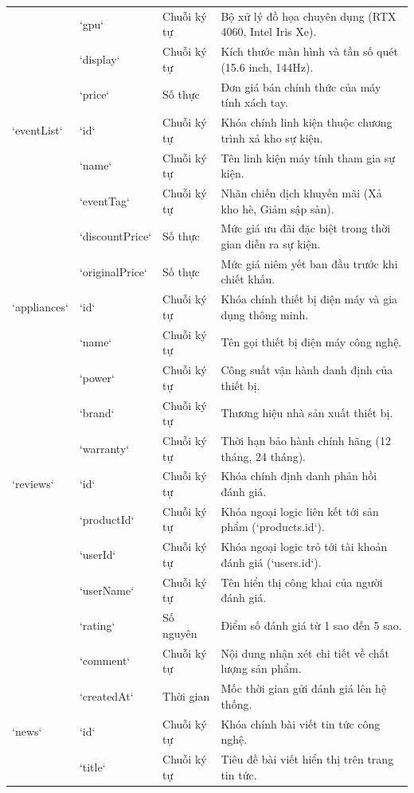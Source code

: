 \begin{table}[H]
\begin{tabularx}{\textwidth}{p{2.5cm}p{2.3cm}p{1.8cm}X}
& `gpu` & Chuỗi ký tự & Bộ xử lý đồ họa chuyên dụng (RTX 4060, Intel Iris Xe). \\
& `display` & Chuỗi ký tự & Kích thước màn hình và tần số quét (15.6 inch, 144Hz). \\
& `price` & Số thực & Đơn giá bán chính thức của máy tính xách tay. \\
\addlinespace
`eventList` & `id` & Chuỗi ký tự & Khóa chính linh kiện thuộc chương trình xả kho sự kiện. \\
& `name` & Chuỗi ký tự & Tên linh kiện máy tính tham gia sự kiện. \\
& `eventTag` & Chuỗi ký tự & Nhãn chiến dịch khuyến mãi (Xả kho hè, Giảm sập sàn). \\
& `discountPrice`& Số thực & Mức giá ưu đãi đặc biệt trong thời gian diễn ra sự kiện. \\
& `originalPrice`& Số thực & Mức giá niêm yết ban đầu trước khi chiết khấu. \\
\addlinespace
`appliances` & `id` & Chuỗi ký tự & Khóa chính thiết bị điện máy và gia dụng thông minh. \\
& `name` & Chuỗi ký tự & Tên gọi thiết bị điện máy công nghệ. \\
& `power` & Chuỗi ký tự & Công suất vận hành danh định của thiết bị. \\
& `brand` & Chuỗi ký tự & Thương hiệu nhà sản xuất thiết bị. \\
& `warranty` & Chuỗi ký tự & Thời hạn bảo hành chính hãng (12 tháng, 24 tháng). \\
\addlinespace
`reviews` & `id` & Chuỗi ký tự & Khóa chính định danh phản hồi đánh giá. \\
& `productId` & Chuỗi ký tự & Khóa ngoại logic liên kết tới sản phẩm (`products.id`). \\
& `userId` & Chuỗi ký tự & Khóa ngoại logic trỏ tới tài khoản đánh giá (`users.id`). \\
& `userName` & Chuỗi ký tự & Tên hiển thị công khai của người đánh giá. \\
& `rating` & Số nguyên & Điểm số đánh giá từ 1 sao đến 5 sao. \\
& `comment` & Chuỗi ký tự & Nội dung nhận xét chi tiết về chất lượng sản phẩm. \\
& `createdAt` & Thời gian & Mốc thời gian gửi đánh giá lên hệ thống. \\
\addlinespace
`news` & `id` & Chuỗi ký tự & Khóa chính bài viết tin tức công nghệ. \\
& `title` & Chuỗi ký tự & Tiêu đề bài viết hiển thị trên trang tin tức. \\

\end{tabularx}
\end{table}

